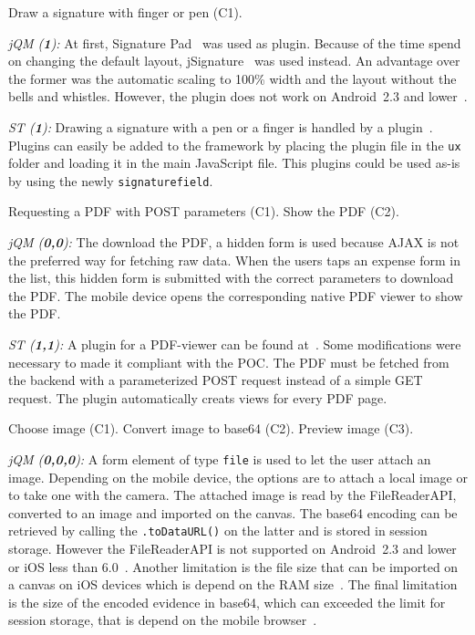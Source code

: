 \documentclass[a4paper]{artikel3}
\newcommand{\code}[1]{\texttt{#1}}
\renewcommand{\paragraph}[1]{\vspace{2mm} \noindent {\bf #1}  }
\newcommand{\framework}[2]{ \emph{#1 (\textbf{#2}): }} %
\newcommand{\challenge}[1]{\paragraph{#1}}
\begin{document}
\challenge{Signature (C1)}
Draw a signature with finger or pen (C1).

\framework{jQM}{1}
At first, Signature Pad~\cite{Bradley2013} was used as plugin.
Because of the time spend on changing the default layout, jSignature~\cite{Systems2013} was used instead.
An advantage over the former was the automatic scaling to 100\% width and the layout without the bells and whistles.
However, the plugin does not work on Android~2.3 and lower~\cite{Systems2013}.

\framework{ST}{1}
Drawing a signature with a pen or a finger is handled by a plugin~\cite{SimFla2011}.  
Plugins can easily be added to the framework by placing the plugin file in the \code{ux} folder and loading it in the main JavaScript file.  
This plugins could be used as-is by using the newly \code{signaturefield}.  

\challenge{Show PDF (C1,C2)}
Requesting a PDF with POST parameters (C1).
Show the PDF (C2).

\framework{jQM}{0,0}
The download the PDF, a hidden form is used because AJAX is not the preferred way for fetching raw data.
When the users taps an expense form in the list, this hidden form is submitted with the correct parameters to download the PDF.
The mobile device opens the corresponding native PDF viewer to show the PDF.

\framework{ST}{1,1}
A plugin for a PDF-viewer can be found at~\cite{Fiedler2012}.  
Some modifications were necessary to made it compliant with the POC.  
The PDF must be fetched from the backend with a parameterized POST request instead of a simple GET request.  
The plugin automatically creats views for every PDF page.  

\challenge{Attach image (C1,C2,C3)}
Choose image (C1).
Convert image to base64 (C2).
Preview image (C3).

\framework{jQM}{0,0,0}
A form element of type \code{file} is used to let the user attach an image.
Depending on the mobile device, the options are to attach a local image or to take one with the camera.
The attached image is read by the FileReaderAPI, converted to an image and imported on the canvas.
The base64 encoding can be retrieved by calling the \code{.toDataURL()} on the latter and is stored in session storage.
However the FileReaderAPI is not supported on Android~2.3 and lower or iOS less than 6.0~\cite{Deveria2013a}.
Another limitation is the file size that can be imported on a canvas on iOS devices which is depend on the RAM size~\cite{Apple2012}.
The final limitation is the size of the encoded evidence in base64, which can exceeded the limit for session storage, that is depend on the mobile browser~\cite{Gonzalez2012}.
\end{document}
